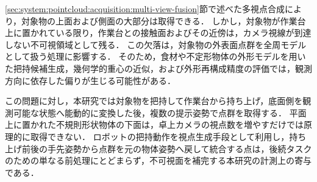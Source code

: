 \ref{sec:system:pointcloud:acquisition:multi-view-fusion}節で述べた多視点合成により，対象物の上面および側面の大部分は取得できる．
しかし，対象物が作業台上に置かれている限り，作業台との接触面およびその近傍は，カメラ視線が到達しない不可視領域として残る．
この欠落は，対象物の外表面点群を全周モデルとして扱う処理に影響する．
そのため，食材や不定形物体の外形モデルを用いた把持候補生成，幾何学的重心の近似，および外形再構成精度の評価では，観測方向に依存した偏りが生じる可能性がある．
\begin{revisionblock}
この問題に対し，本研究では対象物を把持して作業台から持ち上げ，底面側を観測可能な状態へ能動的に変換した後，複数の提示姿勢で点群を取得する．
平面上に置かれた不規則形状物体の下面は，卓上カメラの視点数を増やすだけでは原理的に取得できない．
ロボットの把持動作を視点生成手段として利用し，持ち上げ前後の手先姿勢から点群を元の物体姿勢へ戻して統合する点は，後続タスクのための単なる前処理にとどまらず，不可視面を補完する本研究の計測上の寄与である．
\end{revisionblock}





